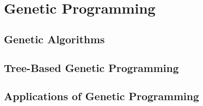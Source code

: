 \chapter{Genetic Programming}
\section{Genetic Algorithms}
\section{Tree-Based Genetic Programming}
\section{Applications of Genetic Programming}